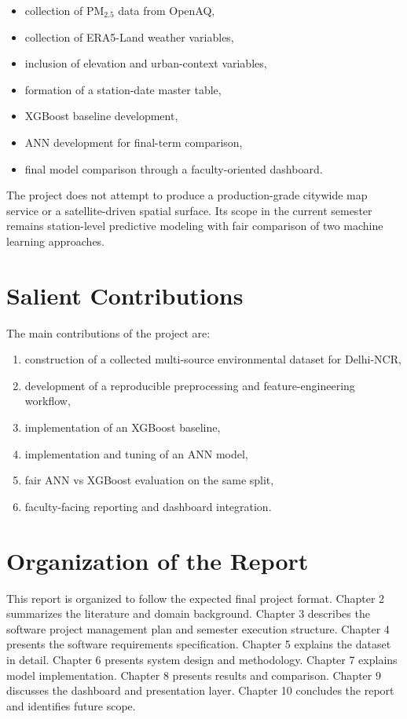 \documentclass[12pt,a4paper]{report}
\begin{document}
\begin{itemize}[leftmargin=1.3cm]
    \item collection of PM$_{2.5}$ data from OpenAQ,
    \item collection of ERA5-Land weather variables,
    \item inclusion of elevation and urban-context variables,
    \item formation of a station-date master table,
    \item XGBoost baseline development,
    \item ANN development for final-term comparison,
    \item final model comparison through a faculty-oriented dashboard.
\end{itemize}

The project does not attempt to produce a production-grade citywide map service or a satellite-driven spatial surface. Its scope in the current semester remains station-level predictive modeling with fair comparison of two machine learning approaches.

\section{Salient Contributions}
The main contributions of the project are:

\begin{enumerate}[leftmargin=1.3cm]
    \item construction of a collected multi-source environmental dataset for Delhi-NCR,
    \item development of a reproducible preprocessing and feature-engineering workflow,
    \item implementation of an XGBoost baseline,
    \item implementation and tuning of an ANN model,
    \item fair ANN vs XGBoost evaluation on the same split,
    \item faculty-facing reporting and dashboard integration.
\end{enumerate}

\section{Organization of the Report}
This report is organized to follow the expected final project format. Chapter 2 summarizes the literature and domain background. Chapter 3 describes the software project management plan and semester execution structure. Chapter 4 presents the software requirements specification. Chapter 5 explains the dataset in detail. Chapter 6 presents system design and methodology. Chapter 7 explains model implementation. Chapter 8 presents results and comparison. Chapter 9 discusses the dashboard and presentation layer. Chapter 10 concludes the report and identifies future scope.
\end{document}

